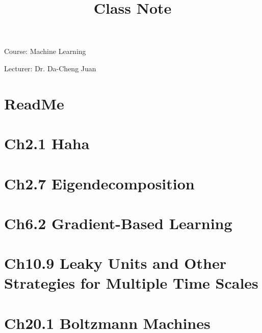 \documentclass{article}
\begin{document}
\title{Class Note}
\Large{Course: Machine Learning}

\Large{Lecturer: Dr. Da-Cheng Juan}
\section{ReadMe}
\label{ReadMe}

\section{Ch2.1 Haha}
\label{Ch2.1}

\section{Ch2.7 Eigendecomposition}
\label{Ch2.7}

\section{Ch6.2 Gradient-Based Learning}
\label{Ch6.2}

\section{Ch10.9 Leaky Units and Other Strategies for Multiple Time Scales}
\label{Ch10.9}

\section{Ch20.1 Boltzmann Machines}
\label{Ch20.1}

\end{document}
